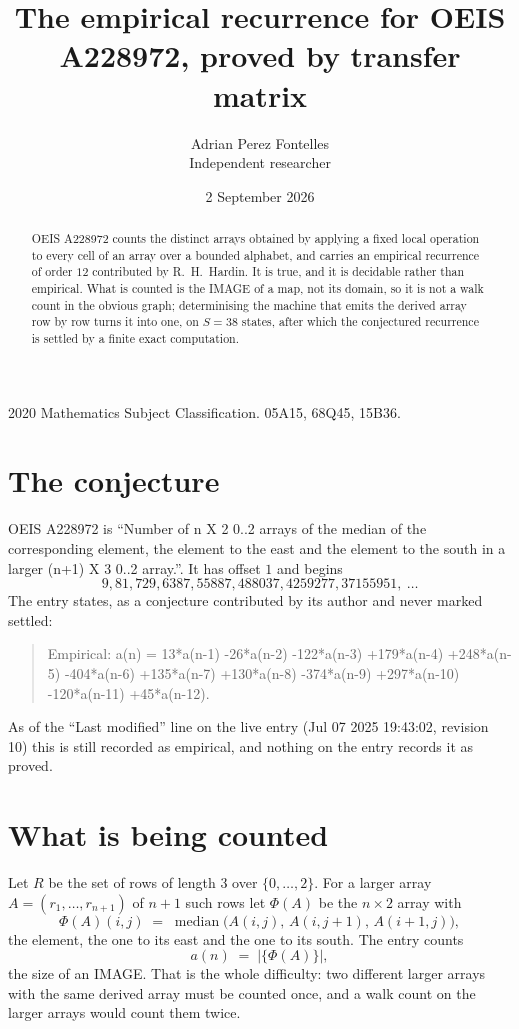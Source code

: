 \documentclass[11pt,a4paper]{article}
\title{The empirical recurrence for OEIS A228972, proved by transfer matrix}
\author{Adrian Perez Fontelles\\ \small Independent researcher}
\date{2 September 2026}
\theoremstyle{plain}
\theoremstyle{definition}
\begin{document}
\maketitle

\begin{abstract}
OEIS A228972 counts the distinct arrays obtained by applying a fixed local operation to every cell
of an array over a bounded alphabet, and carries an empirical recurrence of order $12$
contributed by R.~H.~Hardin. It is true, and it is decidable rather than empirical. What is
counted is the IMAGE of a map, not its domain, so it is not a walk count in the obvious graph;
determinising the machine that emits the derived array row by row turns it into one, on
$S=38$ states, after which the conjectured recurrence is settled by a finite exact
computation.
\end{abstract}

\noindent\small 2020 Mathematics Subject Classification. 05A15, 68Q45, 15B36.\normalsize

\section{The conjecture}

OEIS A228972 is ``Number of n X 2 0..2 arrays of the median of the corresponding element, the element to the east and the element to the south in a larger (n+1) X 3 0..2 array.''. It has offset $1$ and begins
\[
9, 81, 729, 6387, 55887, 488037, 4259277, 37155951,\ \dots
\]
The entry states, as a conjecture contributed by its author and never marked settled:
\begin{quote}
Empirical: a(n) = 13*a(n-1) -26*a(n-2) -122*a(n-3) +179*a(n-4) +248*a(n-5) -404*a(n-6) +135*a(n-7) +130*a(n-8) -374*a(n-9) +297*a(n-10) -120*a(n-11) +45*a(n-12).
\end{quote}
As of the ``Last modified'' line on the live entry (Jul 07 2025 19:43:02, revision 10) this is still
recorded as empirical, and nothing on the entry records it as proved.

\section{What is being counted}

Let $R$ be the set of rows of length $3$ over $\{0,\dots,2\}$.
For a larger array $A=(r_1,\dots,r_{n+1})$ of $n+1$ such rows let $\Phi(A)$ be the
$n\times2$ array with
\[
\Phi(A)(i,j)\;=\;\operatorname{median}\bigl(A(i,j),\,A(i,j+1),\,A(i+1,j)\bigr),
\]
the element, the one to its east and the one to its south. The entry counts
\[
a(n)\;=\;\bigl|\{\Phi(A)\}\bigr| ,
\]
the size of an IMAGE. That is the whole difficulty: two different larger arrays with the same
derived array must be counted once, and a walk count on the larger arrays would count them
twice.
\end{document}
